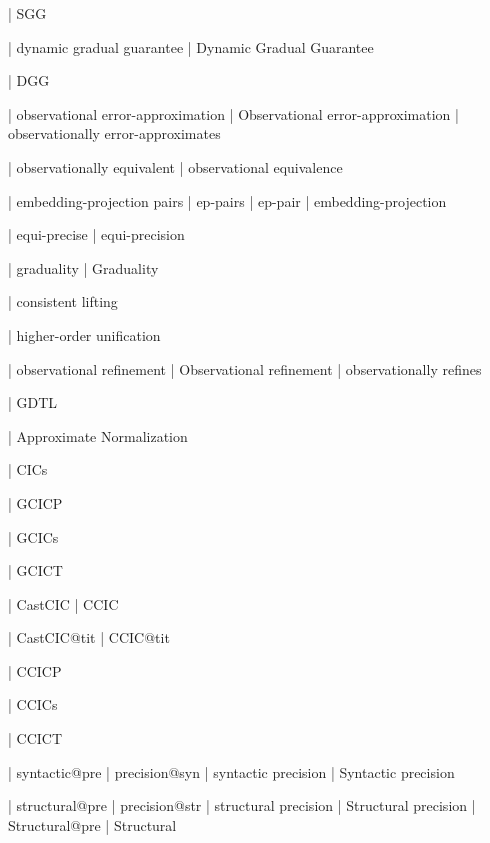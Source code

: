   | SGG

  | dynamic gradual guarantee
  | Dynamic Gradual Guarantee

  | DGG

  | observational error-approximation
  | Observational error-approximation
  | observationally error-approximates

  | observationally equivalent
  | observational equivalence

  | embedding-projection pairs
  | ep-pairs
  | ep-pair
  | embedding-projection

  | equi-precise
  | equi-precision

  | graduality
  | Graduality

  | consistent lifting

  | higher-order unification

  | observational refinement
  | Observational refinement
  | observationally refines

  | GDTL

  | Approximate Normalization

  | CICs

  | GCICP

  | GCICs

  | GCICT

  | CastCIC
  | CCIC

  | CastCIC@tit
  | CCIC@tit

  | CCICP

  | CCICs

  | CCICT

  | syntactic@pre
  | precision@syn
  | syntactic precision
  | Syntactic precision

  | structural@pre
  | precision@str
  | structural precision
  | Structural precision
  | Structural@pre
  | Structural

